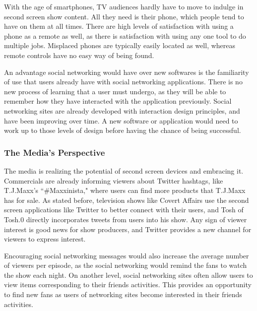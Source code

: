 \documentclass[11pt, oneside]{article}
\begin{document}
With the age of smartphones, TV audiences hardly have to move to indulge in second screen show content. All they need is their phone, which people tend to have on them at all times. There are high levels of satisfaction with using a phone as a remote as well, as there is satisfaction with using any one tool to do multiple jobs. Misplaced phones are typically easily located as well, whereas remote controls have no easy way of being found.

An advantage social networking would have over new softwares is the familiarity of use that users already have with social networking applications. There is no new process of learning that a user must undergo, as they will be able to remember how they have interacted with the application previously. Social networking sites are already developed with interaction design principles, and have been improving over time. A new software or application would need to work up to those levels of design before having the chance of being successful.

\subsubsection{The Media's Perspective}
The media is realizing the potential of second screen devices and embracing it. Commercials are already informing viewers about Twitter hashtags, like T.J.Maxx's ``\#Maxxinista," where users can find more products that T.J.Maxx has for sale. As stated before, television shows like Covert Affairs use the second screen applications like Twitter to better connect with their users, and Tosh of Tosh.0 directly incorporates tweets from users into his show. Any sign of viewer interest is good news for show producers, and Twitter provides a new channel for viewers to express interest. 

Encouraging social networking messages would also increase the average number of viewers per episode, as the social networking would remind the fans to watch the show each night. On another level, social networking sites often allow users to view items corresponding to their friends activities. This provides an opportunity to find new fans as users of networking sites become interested in their friends activities.
\end{document}
